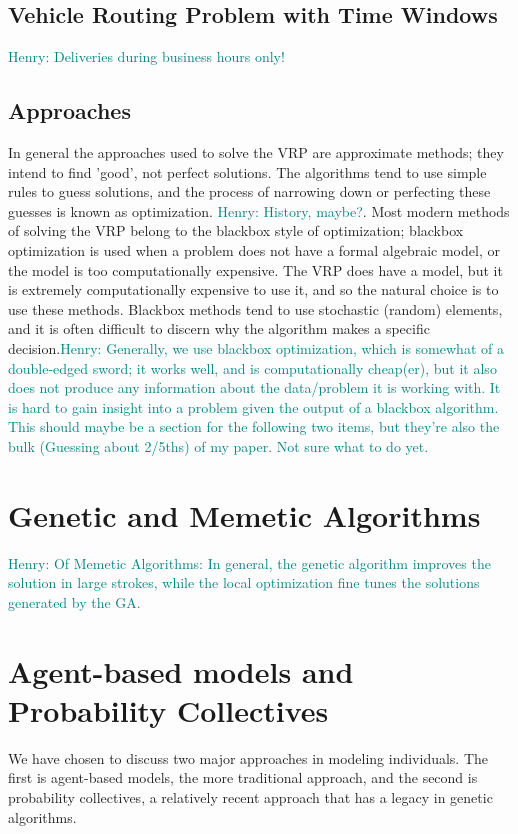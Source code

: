 \documentclass{sig-alternate}
\newcommand{\allcomments}[1]{{#1}}
\newcommand{\hfcomment}[1]{\textcolor{Teal}{\allcomments{Henry: {#1}}}}
\begin{document}
\subsection{Vehicle Routing Problem with Time Windows}
\hfcomment{Deliveries during business hours only!}
\subsection{Approaches}
In general the approaches used to solve the VRP are approximate methods; they intend to find 'good', not perfect solutions. The algorithms tend to use simple rules to guess solutions, and the process of narrowing down or perfecting these guesses is known as optimization. \hfcomment{History, maybe?}. Most modern methods of solving the VRP belong to the blackbox style of optimization; blackbox optimization is used when a problem does not have a formal algebraic model, or the model is too computationally expensive. The VRP does have a model, but it is extremely computationally expensive to use it, and so the natural choice is to use these methods. Blackbox methods tend to use stochastic (random) elements, and it is often difficult to discern why the algorithm makes a specific decision.\hfcomment{Generally, we use blackbox optimization, which is somewhat of a double-edged sword; it works well, and is computationally cheap(er), but it also does not produce any information about the data/problem it is working with. It is hard to gain insight into a problem given the output of a blackbox algorithm. This should maybe be a section for the following two items, but they're also the bulk (Guessing about 2/5ths) of my paper. Not sure what to do yet.}

\section{Genetic and Memetic Algorithms}
\hfcomment{Of Memetic Algorithms: In general, the genetic algorithm improves the solution in large strokes, while the local optimization fine tunes the solutions generated by the GA.}

\section{Agent-based models and Probability Collectives}
\label{sec:not this section.}
We have chosen to discuss two major approaches in modeling individuals. The first is agent-based models, the more traditional approach, and the second is probability collectives, a relatively recent approach that has a legacy in genetic algorithms.
\end{document}
